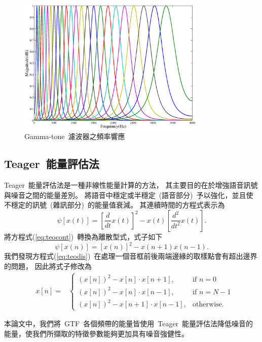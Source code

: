 \begin{figure}[!htb]
\centering
\includegraphics[width=0.8\textwidth]{figs/gafrqres}
\caption{Gamma-tone~濾波器之頻率響應} 
\label{fig:gafrqres}
\end{figure}

\subsection{Teager~能量評估法}
\label{sec:mte}
Teager~能量評估法是一種非線性能量計算的方法，
其主要目的在於增強語音訊號與噪音之間的能量差別。
將語音中穩定或半穩定~(語音部分)~予以強化，並且使不穩定的訊號~(雜訊部分)~的能量值衰減。
其連續時間的方程式表示為
\begin{equation}
\label{eq:teocont}
	\psi \left[ x(t) \right] = \left[  \frac{d}{dt} x(t) \right]^2 - x(t) \left[  \frac{d^2}{dt^2} x(t) \right].
\end{equation}
將方程式(\ref{eq:teocont})~轉換為離散型式，式子如下
\begin{equation}
\label{eq:teodis}
	\psi \left[ x(n)  \right] = \left[  x(n) \right]^2 - x(n+1)x(n-1).
\end{equation}
我們發現方程式(\ref{eq:teodis})~在處理一個音框前後兩端邊緣的取樣點會有超出邊界的問題，
因此將式子修改為
\begin{equation}
    \begin{aligned}
      & x[n] =  & \begin{cases} \left( x[n] \right)^2 - x[n] \cdot x[n+1], &\text{if $n=0$} \\  
					     \left( x[n] \right)^2 - x[n] \cdot x[n-1], &\text{if $n=N-1$} \\  
					     \left( x[n] \right)^2 -x[n+1] \cdot x[n-1],&\text{otherwise}.
	\end{cases} 
    \end{aligned}
 \end{equation}        

本論文中，我們將~GTF~各個頻帶的能量皆使用~Teager~能量評估法降低噪音的能量，使我們所擷取的特徵參數能夠更加具有噪音強健性。
